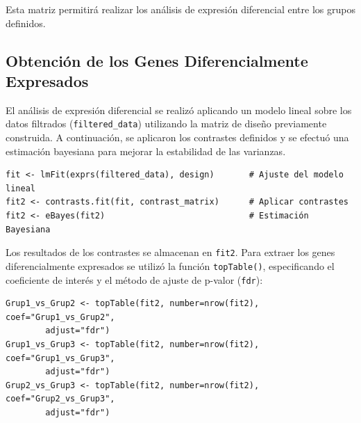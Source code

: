 \documentclass[12pt,a4paper]{article}
\begin{document}
Esta matriz permitirá realizar los análisis de expresión diferencial entre los grupos definidos.




\subsection{Obtención de los Genes Diferencialmente Expresados}

El análisis de expresión diferencial se realizó aplicando un modelo lineal sobre los datos filtrados (\texttt{filtered\_data}) utilizando la matriz de diseño previamente construida. A continuación, se aplicaron los contrastes definidos y se efectuó una estimación bayesiana para mejorar la estabilidad de las varianzas.

\begin{verbatim}
fit <- lmFit(exprs(filtered_data), design)       # Ajuste del modelo lineal
fit2 <- contrasts.fit(fit, contrast_matrix)      # Aplicar contrastes
fit2 <- eBayes(fit2)                             # Estimación Bayesiana
\end{verbatim}

Los resultados de los contrastes se almacenan en \texttt{fit2}. Para extraer los genes diferencialmente expresados se utilizó la función \texttt{topTable()}, especificando el coeficiente de interés y el método de ajuste de p-valor (\texttt{fdr}):

\begin{verbatim}
Grup1_vs_Grup2 <- topTable(fit2, number=nrow(fit2), coef="Grup1_vs_Grup2", 
        adjust="fdr")
Grup1_vs_Grup3 <- topTable(fit2, number=nrow(fit2), coef="Grup1_vs_Grup3", 
        adjust="fdr")
Grup2_vs_Grup3 <- topTable(fit2, number=nrow(fit2), coef="Grup2_vs_Grup3", 
        adjust="fdr")
\end{verbatim}
\end{document}
